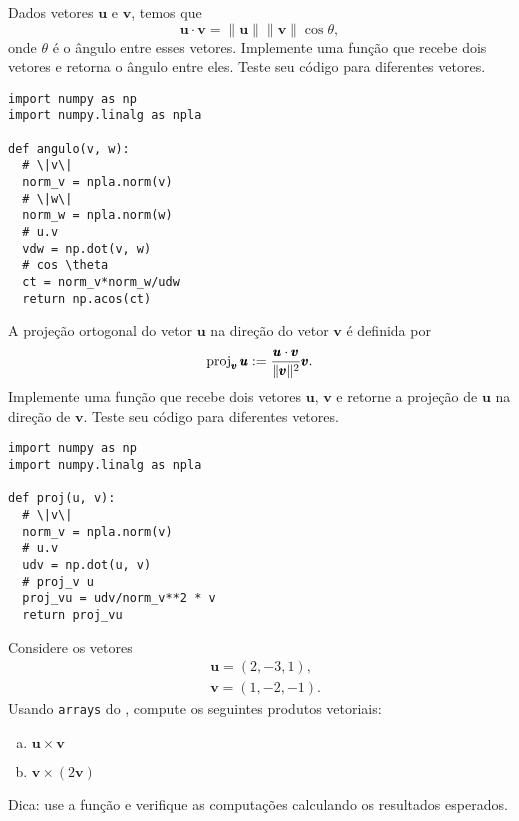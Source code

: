 \begin{exer}
  Dados vetores $\pmb{u}$ e $\pmb{v}$, temos que
  \begin{equation}
    \pmb{u}\cdot\pmb{v} = \|\pmb{u}\|\|\pmb{v}\|\cos\theta,
  \end{equation}
  onde $\theta$ é o ângulo entre esses vetores. Implemente uma função que recebe dois vetores e retorna o ângulo entre eles. Teste seu código para diferentes vetores.
\end{exer}
\begin{resp}

\begin{lstlisting}
import numpy as np
import numpy.linalg as npla

def angulo(v, w):
  # \|v\|
  norm_v = npla.norm(v)
  # \|w\|
  norm_w = npla.norm(w)
  # u.v
  vdw = np.dot(v, w)
  # cos \theta
  ct = norm_v*norm_w/udw
  return np.acos(ct)
\end{lstlisting}

\end{resp}

\begin{exer}
  A projeção ortogonal do vetor $\pmb{u}$ na direção do vetor $\pmb{v}$ é definida por
  \begin{equation}
    \operatorname{proj}_{\pmb{v}} \pmb{u} := \frac{\pmb{u}\cdot\pmb{v}}{\|\pmb{v}\|^2}\pmb{v}.
  \end{equation}
  Implemente uma função que recebe dois vetores $\pmb{u}$, $\pmb{v}$ e retorne a projeção de $\pmb{u}$ na direção de $\pmb{v}$. Teste seu código para diferentes vetores.
\end{exer}
\begin{resp}

\begin{lstlisting}
import numpy as np
import numpy.linalg as npla

def proj(u, v):
  # \|v\|
  norm_v = npla.norm(v)
  # u.v
  udv = np.dot(u, v)
  # proj_v u
  proj_vu = udv/norm_v**2 * v
  return proj_vu
\end{lstlisting}

\end{resp}

\begin{exer}
  Considere os vetores
  \begin{align}
    & \pmb{u} = (2, -3, 1), \\
    & \pmb{v} = (1, -2, -1).
  \end{align}
  Usando \texttt{arrays} do {\numpy}, compute os seguintes produtos vetoriais:
  \begin{enumerate}[a)]
  \item $\pmb{u}\times\pmb{v}$
  \item $\pmb{v}\times (2\pmb{v})$
  \end{enumerate}
\end{exer}
\begin{resp}
  Dica: use a função {\PYTHONnumpyDOTcross} e verifique as computações calculando os resultados esperados.
\end{resp}


